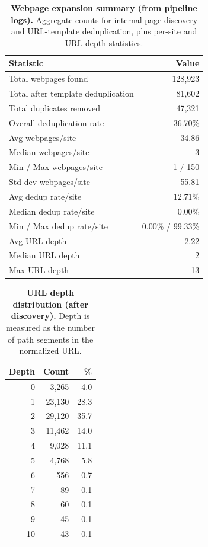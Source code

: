 \begin{table}[t]
\centering
\small
\setlength{\tabcolsep}{5pt}
\renewcommand{\arraystretch}{1.12}
\begin{tabular}{l r}
\toprule
\textbf{Statistic} & \textbf{Value} \\
\midrule
Total webpages found & 128{,}923 \\
Total after template deduplication & 81{,}602 \\
Total duplicates removed & 47{,}321 \\
Overall deduplication rate & 36.70\% \\
\midrule
Avg webpages/site & 34.86 \\
Median webpages/site & 3 \\
Min / Max webpages/site & 1 / 150 \\
Std dev webpages/site & 55.81 \\
\midrule
Avg dedup rate/site & 12.71\% \\
Median dedup rate/site & 0.00\% \\
Min / Max dedup rate/site & 0.00\% / 99.33\% \\
\midrule
Avg URL depth & 2.22 \\
Median URL depth & 2 \\
Max URL depth & 13 \\
\bottomrule
\end{tabular}
\caption{\textbf{Webpage expansion summary (from pipeline logs).} Aggregate counts for internal page discovery and URL-template deduplication, plus per-site and URL-depth statistics.}
\label{tab:page-expansion-summary}
\end{table}

\begin{table}[t]
\centering
\small
\setlength{\tabcolsep}{5pt}
\renewcommand{\arraystretch}{1.12}
\begin{tabular}{r r r}
\toprule
\textbf{Depth} & \textbf{Count} & \textbf{\%} \\
\midrule
0 & 3{,}265  & 4.0 \\
1 & 23{,}130 & 28.3 \\
2 & 29{,}120 & 35.7 \\
3 & 11{,}462 & 14.0 \\
4 & 9{,}028  & 11.1 \\
5 & 4{,}768  & 5.8 \\
6 & 556      & 0.7 \\
7 & 89       & 0.1 \\
8 & 60       & 0.1 \\
9 & 45       & 0.1 \\
10 & 43      & 0.1 \\
\bottomrule
\end{tabular}
\caption{\textbf{URL depth distribution (after discovery).} Depth is measured as the number of path segments in the normalized URL.}
\label{tab:url-depth-distribution}
\end{table}

